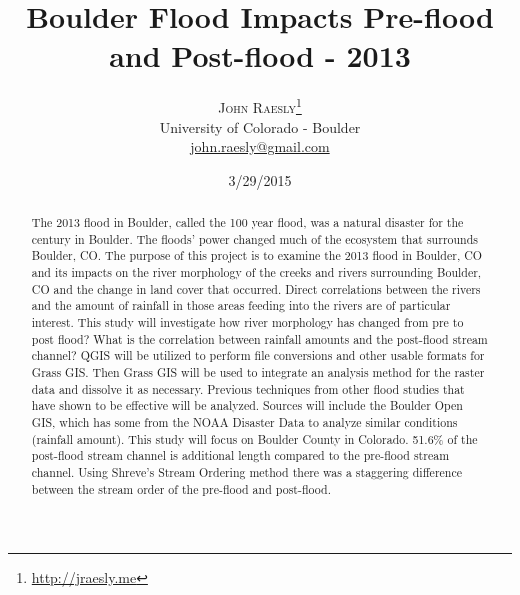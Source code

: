 \documentclass[twoside]{article}
\title{\vspace{-15mm}\fontsize{24pt}{10pt}\selectfont\textbf{Boulder Flood Impacts Pre-flood and Post-flood - 2013}} %
\author{
\large
\textsc{John Raesly}\thanks{\url{http://jraesly.me}}\\[2mm] %
\normalsize University of Colorado - Boulder \\ %
\normalsize \href{mailto:john.raesly@gmail.com}{john.raesly@gmail.com} %
\vspace{-3mm}
}
\date{3/29/2015}
\begin{document}
\maketitle %

\thispagestyle{fancy} %


\begin{abstract}

The 2013 flood in Boulder, called the 100 year flood, was a natural disaster for the century in Boulder. The floods' power changed much of the ecosystem that surrounds Boulder, CO. The purpose of this project is to examine the 2013 flood in Boulder, CO and its impacts on the river morphology of the creeks and rivers surrounding Boulder, CO and the change in land cover that occurred. Direct correlations between the rivers and the amount of rainfall in those areas feeding into the rivers are of particular interest. This study will investigate how river morphology has changed from pre to post flood? What is the correlation between rainfall amounts and the post-flood stream channel? QGIS will be utilized to perform file conversions and other usable formats for Grass GIS. Then Grass GIS will be used to integrate an analysis method for the raster data and dissolve it as necessary. Previous techniques from other flood studies that have shown to be effective will be analyzed. Sources will include the Boulder Open GIS, which has some from the NOAA Disaster Data to analyze similar conditions (rainfall amount). This study will focus on Boulder County in Colorado. 51.6\% of the post-flood stream channel is additional length compared to the pre-flood stream channel. Using Shreve's Stream Ordering method there was a staggering difference between the stream order of the pre-flood and post-flood. 

\end{abstract}

\end{document}
